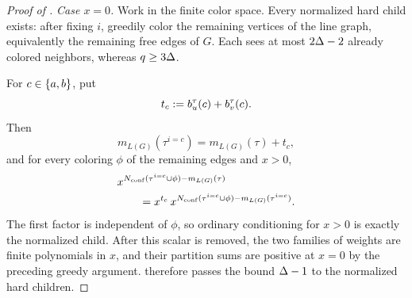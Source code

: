 \begin{proof}[Proof of ]
\emph{Case \(x=0\).}
Work in the finite color space.  Every normalized hard child exists:
after fixing \(i\), greedily color the remaining vertices of
the line graph, equivalently the remaining free edges of \(G\).  Each sees
at most \(2\Delta-2\) already colored neighbors,
whereas \(q\ge3\Delta\).

For \(c\in\left\{a,b\right\}\), put
\[
  t_c:=b_u^\tau(c)+b_v^\tau(c).
\]
Then
\[
  m_{L(G)}(\tau^{i=c})
  =m_{L(G)}(\tau)+t_c,
\]
and for every coloring \(\phi\) of the remaining edges and \(x>0\),
\[
\begin{aligned}
  &x^{N_{\mathrm{conf}}(\tau^{i=c}\cup\phi)
       -m_{L(G)}(\tau)}\\
  &\qquad
  =
  x^{t_c}\,
  x^{N_{\mathrm{conf}}(\tau^{i=c}\cup\phi)
       -m_{L(G)}(\tau^{i=c})}.
\end{aligned}
\]
The first factor is independent of \(\phi\), so ordinary conditioning for
\(x>0\) is exactly the normalized child.  After this scalar is removed,
the two families of weights are finite polynomials in \(x\), and their
partition sums are positive at \(x=0\) by the preceding greedy argument.
 therefore passes the bound
\(\Delta-1\) to the normalized hard children.
\end{proof}

